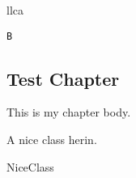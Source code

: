 \def\llcb{
\llca%
llca
}
\llcb

\def\llcc #1{\llca #1\llca }
\begin{alltt}
\llcc{\llca }B
\end{alltt}

\begin{lcHtmlBlock}
\chapter{Test Chapter}

This is my chapter body.

A nice class herin.

\begin{ccClass}{NiceClass}
\end{ccClass}
\end{lcHtmlBlock}

